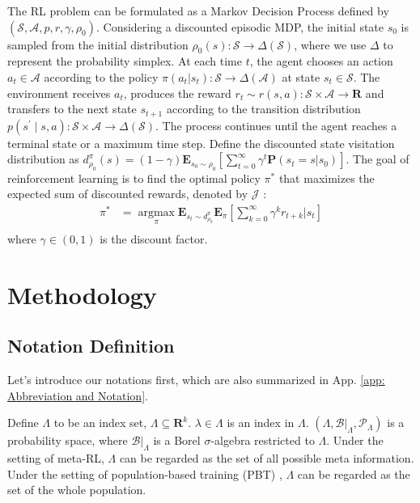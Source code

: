  The RL problem can be formulated as a Markov Decision Process \citep[MDP]{howard1960dynamic} defined by $\left(\mathcal{S}, \mathcal{A}, p, r, \gamma, \rho_{0}\right)$. 
 Considering a discounted episodic MDP, the initial state $s_0$ is sampled from the initial distribution $\rho_0(s): \mathcal{S} \rightarrow \Delta(\mathcal{S})$, where we use $\Delta$ to represent the probability simplex.
 At each time $t$, the agent chooses an action $a_t \in \mathcal{A}$ according to the policy $\pi(a_t|s_t): \mathcal{S} \rightarrow \Delta(\mathcal{A})$ at state $s_t \in \mathcal{S}$. 
 The environment receives $a_t$, produces the reward $r_t \sim r(s,a): \mathcal{S} \times \mathcal{A} \rightarrow \mathbf{R}$ and transfers to the next state $s_{t+1}$  according to the transition distribution $p\left(s^{\prime} \mid s, a\right): \mathcal{S} \times \mathcal{A} \rightarrow \Delta(\mathcal{S})$. 
 The process continues until the agent reaches a terminal state or a maximum time step. 
 Define the discounted state visitation distribution as 
 $d_{\rho_0}^{\pi} (s) = (1 - \gamma) \textbf{E}_{s_0 \sim \rho_0} 
 \left[ \sum_{t=0}^{\infty} \gamma^t \textbf{P} (s_t = s | s_0) \right]$.
 The goal of reinforcement learning is to find the optimal policy $\pi^*$ that maximizes the expected sum of discounted rewards, denoted by $\mathcal{J}$ \citep{sutton}:
\begin{equation}
\label{eq_accmulate_reward}
\begin{aligned}
\pi^{*}
&= \underset{\pi}{\operatorname{argmax}} \textbf{E}_{s_t \sim d_{\rho_0}^{\pi}} \textbf{E}_{\pi} \left[\sum_{k=0}^{\infty} \gamma^{k} r_{t+k} | s_t \right] \\
\end{aligned}
\end{equation}
where $\gamma \in(0,1)$ is the discount factor.


\section{Methodology}
\label{Sec: Methodology}
\subsection{Notation Definition}

Let's introduce our notations first, which are also summarized in App. \ref{app: Abbreviation and Notation}.

Define $\Lambda$ to be an index set, $\Lambda \subseteq \textbf{R}^k$.
$\lambda \in \Lambda$ is an index in $\Lambda$.
$(\Lambda, \mathcal{B}|_{\Lambda}, \mathcal{P}_{\Lambda})$ is a probability space, where $\mathcal{B}|_{\Lambda}$ is a Borel $\sigma$-algebra restricted to $\Lambda$.
Under the setting of meta-RL, $\Lambda$ can be regarded as the set of all possible meta information.
Under the setting of population-based training (PBT) \citep{PBT}, $\Lambda$ can be regarded as the set of the whole population.

